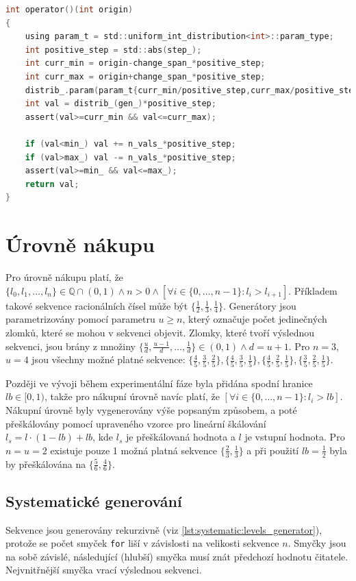 \begin{lstlisting}[caption={~Metoda pro náhodné generování periody z počátku},label={lst:random:int:range:generator:origin},captionpos=t,abovecaptionskip=-\medskipamount,belowcaptionskip=\medskipamount,language=C]
int operator()(int origin)
{
    using param_t = std::uniform_int_distribution<int>::param_type;
    int positive_step = std::abs(step_);
    int curr_min = origin-change_span_*positive_step;
    int curr_max = origin+change_span_*positive_step;
    distrib_.param(param_t{curr_min/positive_step,curr_max/positive_step});
    int val = distrib_(gen_)*positive_step;
    assert(val>=curr_min && val<=curr_max);

    if (val<min_) val += n_vals_*positive_step;
    if (val>max_) val -= n_vals_*positive_step;
    assert(val>=min_ && val<=max_);
    return val;
}
\end{lstlisting}

\section{Úrovně nákupu}
Pro úrovně nákupu platí, že $\{l_0, l_1,\dots,l_n\} \in \mathbb{Q} \cap (0, 1) \land n>0 \land [\forall i \in \{0,\dots,n-1\} : l_i > l_{i+1}]$.
Příkladem takové sekvence racionálních čísel může být $\{\frac{1}{2}, \frac{1}{3}, \frac{1}{4}\}$.
Generátory jsou parametrizovány pomocí parametru $u\geq n$, který označuje počet jedinečných zlomků, které se mohou v sekvenci objevit.
Zlomky, které tvoří výslednou sekvenci, jsou brány z množiny $\{\frac{u}{d}, \frac{u-1}{d},\dots, \frac{1}{d}\} \in (0, 1) \land d=u+1$.
Pro $n=3$, $u=4$ jsou všechny možné platné sekvence: $\{\frac{4}{5}, \frac{3}{5}, \frac{2}{5}\}, \{\frac{4}{5}, \frac{3}{5}, \frac{1}{5}\}, \{\frac{4}{5}, \frac{2}{5}, \frac{1}{5}\}, \{\frac{3}{5}, \frac{2}{5}, \frac{1}{5}\}$.

Později ve vývoji během experimentální fáze byla přidána spodní hranice $lb\in[0, 1)$, takže pro nákupní úrovně navíc platí, že $[\forall i \in \{0,\dots,n-1\} : l_i > lb] $.
Nákupní úrovně byly vygenerovány výše popsaným způsobem, a poté přeškálovány pomocí upraveného vzorce pro lineární škálování $l_s=l\cdot(1-lb)+lb$, kde $l_s$ je přeškálovaná hodnota a $l$ je vstupní hodnota.
Pro $n=u=2$ existuje pouze 1 možná platná sekvence $\{\frac{2}{3},\frac{1}{3}\}$ a při použití $lb=\frac{1}{2}$ byla by přeškálována na $\{\frac{5}{6},\frac{4}{6}\}$.


\subsection{Systematické generování}
Sekvence jsou generovány rekurzivně (viz \ref{lst:systematic:levels_generator}), protože se počet smyček \texttt{for} liší v závislosti na velikosti sekvence $n$.
Smyčky jsou na sobě závislé, následující (hlubší) smyčka musí znát předchozí hodnotu čitatele.
Nejvnitřnější smyčka vrací výslednou sekvenci.

